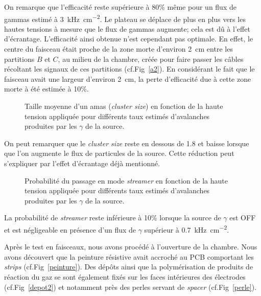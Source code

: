 On remarque que l'efficacité reste supérieure à 80\% même pour un flux de gammas estimé à \SI{3}{\kilo\hertz\per\square\centi\meter}. Le plateau se déplace de plus en plus vers les hautes tensions à mesure que le flux de gammas augmente; cela est dû à l'effet d'écrantage. L'efficacité ainsi obtenue n'est cependant pas optimale. En effet, le centre du faisceau était proche de la zone morte d'environ \SI{2}{\centi\meter} entre les partitions $B$ et $C$, au milieu de la chambre, créée pour faire passer les câbles récoltant les signaux de ces partitions (cf.Fig~\ref{a2}). En considérant le fait que le faisceau avait une largeur d'environ \SI{2}{\centi\meter}, la perte d'efficacité due à cette zone morte à été estimée à \num{10}\%.

\begin{figure}[!ht]
	\centering
	\caption{Taille moyenne d'un amas (\textit{cluster size}) en fonction de la haute tension appliquée pour différents taux estimés d'avalanches produites par les $\gamma$ de la source.}
	\label{clustersize}
\end{figure}

On peut remarquer que le \textit{cluster size} reste en dessous de \num{1.8} et baisse lorsque que l'on augmente le flux de particules de la source. Cette réduction peut s'expliquer par l'effet d'écrantage déjà mentionné.

\begin{figure}[!ht]
	\centering
	\caption{Probabilité du passage en mode \textit{streamer} en fonction de la haute tension appliquée pour différents taux estimés d'avalanches produites par les $\gamma$ de la source.}
	\label{probastreamer}
\end{figure}

La probabilité de \textit{streamer} reste inférieure à 10\% lorsque la source de $\gamma$ est OFF et est négligeable en présence d'un flux de $\gamma$ supérieur à \SI{0.7}{\kilo\hertz\per\square\centi\meter}.

Après le test en faisceaux, nous avons procédé à l'ouverture de la chambre. Nous avons découvert que la peinture résistive avait accroché au PCB comportant les \textit{strips} (cf.Fig~\ref{peinture}). Des dépôts ainsi que la polymérisation de produits de réaction du gaz se sont également fixés sur les faces intérieures des électrodes (cf.Fig~\ref{depot2}) et notamment près des perles servant de \textit{spacer} (cf.Fig~\ref{perle}). 

